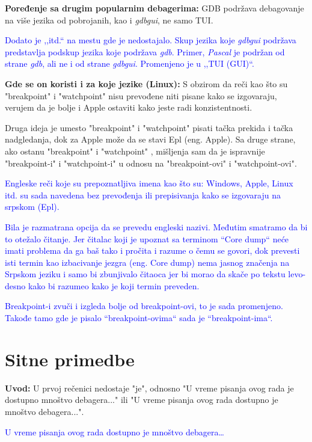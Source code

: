 \documentclass[a4paper]{report}
\newcommand{\odgovor}[1]{\textcolor{blue}{#1}}
\begin{document}
\textbf{Poređenje sa drugim popularnim debagerima: } GDB podržava debagovanje na više jezika od pobrojanih, kao i  \textit{gdbgui}, ne samo TUI.

\odgovor{Dodato je ,,itd.`` na mestu gde je nedostajalo. Skup jezika koje \textit{gdbgui} podržava predstavlja podskup jezika koje podržava \textit{gdb}. Primer, \textit{Pascal} je podržan od strane \textit{gdb}, ali ne i od strane \textit{gdbgui}. Promenjeno je u ,,TUI (GUI)``.}

\textbf{Gde se on koristi i za koje jezike (Linux):} S obzirom da reči kao što su "breakpoint"{} i "watchpoint"{} nisu prevođene niti pisane kako se izgovaraju, verujem da je bolje i Apple 
ostaviti kako jeste radi konzistentnosti.

Druga ideja je umesto "breakpoint"{} i "watchpoint"{} pisati tačka prekida i tačka nadgledanja, dok za Apple može da se stavi Epl (eng. Apple). Sa druge strane, ako ostanu
"breakpoint"{} i "watchpoint" ,
mišljenja sam da je ispravnije "breakpoint-i"{} i "watchpoint-i"{} u odnosu na "breakpoint-ovi"{} i "watchpoint-ovi".

\odgovor{
Engleske reči koje su prepoznatljiva imena kao što su: Windows, Apple, Linux itd. su sada navedena bez prevođenja ili prepisivanja kako se izgovaraju na srpskom (Epl).
}

\odgovor{
Bila je razmatrana opcija da se prevedu engleski nazivi. Međutim smatramo da bi to otežalo čitanje. Jer čitalac koji je upoznat sa terminom ``Core dump`` neće imati problema da ga baš tako i pročita i razume o čemu se govori, dok prevesti isti termin kao izbacivanje jezgra (eng. Core dump) nema jasnog značenja na Srpskom jeziku i samo bi zbunjivalo čitaoca jer bi morao da skače po tekstu levo-desno kako bi razumeo kako je koji termin preveden.}

\odgovor{ Breakpoint-i zvuči i izgleda bolje od breakpoint-ovi, to je sada promenjeno. Takođe tamo gde je pisalo ``breakpoint-ovima`` sada je ``breakpoint-ima``.
}

\section{Sitne primedbe}
\textbf{Uvod:} U prvoj rečenici nedostaje "je", odnosno "U vreme pisanja ovog rada je dostupno mnoštvo debagera..."{} ili "U vreme pisanja ovog rada dostupno je mnoštvo debagera...".

\odgovor{
  U vreme pisanja ovog rada dostupno je mnoštvo debagera\ldots
}
\end{document}
